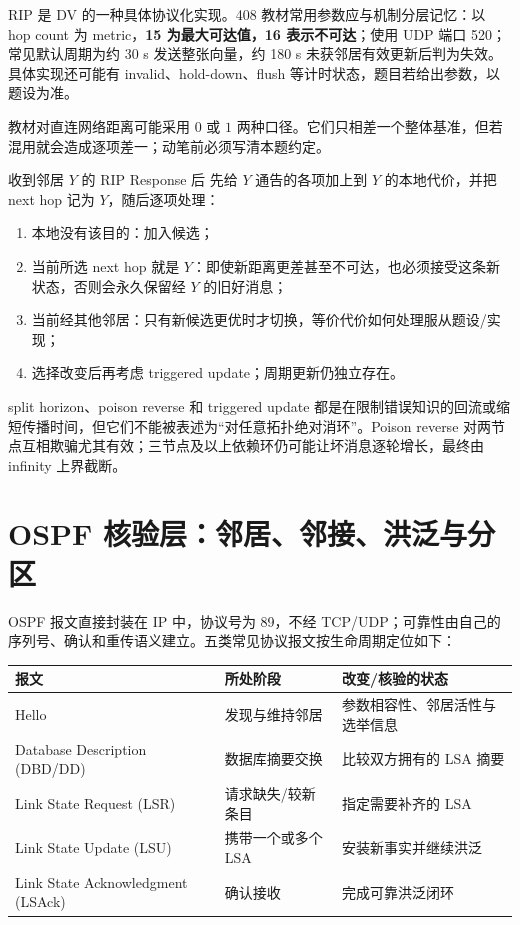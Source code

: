 \documentclass[11pt,a4paper]{ctexart}
\newcommand{\kw}[1]{\textbf{\color{deep}#1}}
\begin{document}
RIP 是 DV 的一种具体协议化实现。408 教材常用参数应与机制分层记忆：以 hop count 为 metric，\kw{15 为最大可达值，16 表示不可达}；使用 UDP 端口 520；常见默认周期为约 30 s 发送整张向量，约 180 s 未获邻居有效更新后判为失效。具体实现还可能有 invalid、hold-down、flush 等计时状态，题目若给出参数，以题设为准。

教材对直连网络距离可能采用 $0$ 或 $1$ 两种口径。它们只相差一个整体基准，但若混用就会造成逐项差一；动笔前必须写清本题约定。

\begin{methodbox}{收到邻居 $Y$ 的 RIP Response 后}
先给 $Y$ 通告的各项加上到 $Y$ 的本地代价，并把 next hop 记为 $Y$，随后逐项处理：
\begin{enumerate}
  \item 本地没有该目的：加入候选；
  \item 当前所选 next hop 就是 $Y$：即使新距离更差甚至不可达，也必须接受这条新状态，否则会永久保留经 $Y$ 的旧好消息；
  \item 当前经其他邻居：只有新候选更优时才切换，等价代价如何处理服从题设/实现；
  \item 选择改变后再考虑 triggered update；周期更新仍独立存在。
\end{enumerate}
\end{methodbox}

split horizon、poison reverse 和 triggered update 都是在限制错误知识的回流或缩短传播时间，但它们不能被表述为“对任意拓扑绝对消环”。Poison reverse 对两节点互相欺骗尤其有效；三节点及以上依赖环仍可能让坏消息逐轮增长，最终由 infinity 上界截断。

\section{OSPF 核验层：邻居、邻接、洪泛与分区}

OSPF 报文直接封装在 IP 中，协议号为 89，不经 TCP/UDP；可靠性由自己的序列号、确认和重传语义建立。五类常见协议报文按生命周期定位如下：

\begin{center}\small
\begin{tabularx}{\linewidth}{L{2.2cm}Y Y}
\toprule
报文 & 所处阶段 & 改变/核验的状态\\
\midrule
Hello & 发现与维持邻居 & 参数相容性、邻居活性与选举信息\\
Database Description (DBD/DD) & 数据库摘要交换 & 比较双方拥有的 LSA 摘要\\
Link State Request (LSR) & 请求缺失/较新条目 & 指定需要补齐的 LSA\\
Link State Update (LSU) & 携带一个或多个 LSA & 安装新事实并继续洪泛\\
Link State Acknowledgment (LSAck) & 确认接收 & 完成可靠洪泛闭环\\
\bottomrule
\end{tabularx}
\end{center}
\end{document}
